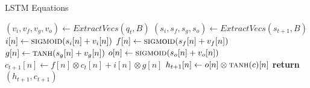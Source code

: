 \begin{algorithm}[h]
	\caption{LSTM Equations}
   \label{Algo:LSTMEq}
	\begin{algorithmic}[1]
		\State $(v_i,v_f,v_g,v_o)\gets ExtractVecs(q_t,B)$
		\State $(s_i,s_f,s_g,s_o)\gets ExtractVecs(s_{t+1},B)$
		\State $i[n]\gets \Call{sigmoid}{s_i[n]+ v_i[n]}$
		\State $f[n]\gets \Call{sigmoid}{s_f[n]+ v_f[n]}$
		\State $g[n]\gets    \Call{tanh}{s_g[n]+v_g[n]}$
		\State $o[n]\gets  \Call{sigmoid}{s_o[n]+ v_o[n]}$
		\State $c_{t+1}[n]\gets f[n]\otimes c_t[n] + i[n]\otimes g[n]$
		\State $h_{t+1}[n]\gets o[n]\otimes \Call{tanh}{c}[n]$
		\State \textbf{return}$(h_{t+1},c_{t+1})$	
		\EndFor
		\EndProcedure
	\end{algorithmic}
\end{algorithm}
